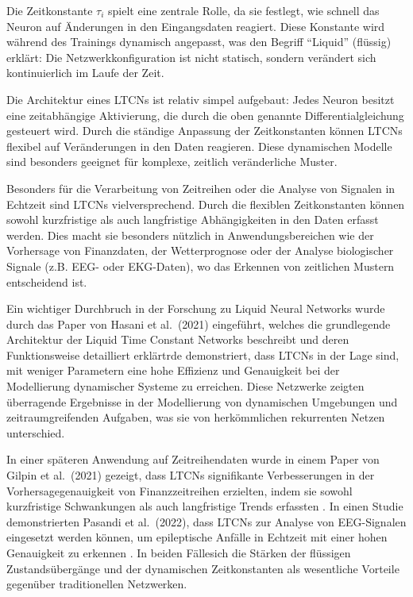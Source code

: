 \documentclass[11pt,ngerman,a4paper,]{article}
\begin{document}
Die Zeitkonstante \(\tau_i\) spielt eine zentrale Rolle, da sie festlegt, wie schnell das Neuron auf Änderungen in den Eingangsdaten reagiert. Diese Konstante wird während des Trainings dynamisch angepasst, was den Begriff ``Liquid'' (flüssig) erklärt: Die Netzwerkkonfiguration ist nicht statisch, sondern verändert sich kontinuierlich im Laufe der Zeit.

Die Architektur eines LTCNs ist relativ simpel aufgebaut: Jedes Neuron besitzt eine zeitabhängige Aktivierung, die durch die oben genannte Differentialgleichung gesteuert wird. Durch die ständige Anpassung der Zeitkonstanten können LTCNs flexibel auf Veränderungen in den Daten reagieren. Diese dynamischen Modelle sind besonders geeignet für komplexe, zeitlich veränderliche Muster.

Besonders für die Verarbeitung von Zeitreihen oder die Analyse von Signalen in Echtzeit sind LTCNs vielversprechend. Durch die flexiblen Zeitkonstanten können sowohl kurzfristige als auch langfristige Abhängigkeiten in den Daten erfasst werden. Dies macht sie besonders nützlich in Anwendungsbereichen wie der Vorhersage von Finanzdaten, der Wetterprognose oder der Analyse biologischer Signale (z.B. EEG- oder EKG-Daten), wo das Erkennen von zeitlichen Mustern entscheidend ist.

Ein wichtiger Durchbruch in der Forschung zu Liquid Neural Networks wurde durch das Paper von Hasani et al.~(2021) eingeführt, welches die grundlegende Architektur der Liquid Time Constant Networks beschreibt und deren Funktionsweise detailliert erklärtrde demonstriert, dass LTCNs in der Lage sind, mit weniger Parametern eine hohe Effizienz und Genauigkeit bei der Modellierung dynamischer Systeme zu erreichen. Diese Netzwerke zeigten überragende Ergebnisse in der Modellierung von dynamischen Umgebungen und zeitraumgreifenden Aufgaben, was sie von herkömmlichen rekurrenten Netzen unterschied.

In einer späteren Anwendung auf Zeitreihendaten wurde in einem Paper von Gilpin et al.~(2021) gezeigt, dass LTCNs signifikante Verbesserungen in der Vorhersagegenauigkeit von Finanzzeitreihen erzielten, indem sie sowohl kurzfristige Schwankungen als auch langfristige Trends erfassten . In einen Studie demonstrierten Pasandi et al.~(2022), dass LTCNs zur Analyse von EEG-Signalen eingesetzt werden können, um epileptische Anfälle in Echtzeit mit einer hohen Genauigkeit zu erkennen . In beiden Fällesich die Stärken der flüssigen Zustandsübergänge und der dynamischen Zeitkonstanten als wesentliche Vorteile gegenüber traditionellen Netzwerken.
\end{document}
